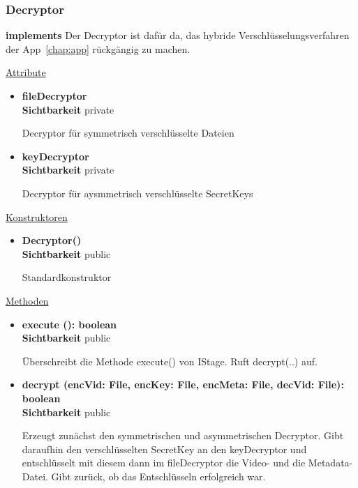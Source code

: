 \subsubsection{Decryptor} \label{service:klasse:Decryptor}
\textbf{implements}  \newline
Der Decryptor ist dafür da, das hybride Verschlüsselungsverfahren der App~\eqref{chap:app} rückgängig zu machen.\newline

\underline{Attribute}
\begin{itemize}
\itemsep0pt
\item \textbf{fileDecryptor} \hfill \\
\textbf{Sichtbarkeit} private

Decryptor für symmetrisch verschlüsselte Dateien

\item \textbf{keyDecryptor} \hfill \\
\textbf{Sichtbarkeit} private

Decryptor für aysmmetrisch verschlüsselte SecretKeys

\end{itemize}

\underline{Konstruktoren}
\begin{itemize}
\itemsep0pt
\item \textbf{Decryptor()} \hfill\\
\textbf{Sichtbarkeit} public

Standardkonstruktor
\end{itemize}

\underline{Methoden}
\begin{itemize}
\itemsep0pt
\item \textbf{execute (): boolean}\hfill\\
\textbf{Sichtbarkeit} public

Überschreibt die Methode execute() von IStage. Ruft decrypt(..) auf.

\item \textbf{decrypt (encVid: File, encKey: File, 
encMeta: File, decVid: File): boolean}\hfill\\
\textbf{Sichtbarkeit} public

Erzeugt zunächst den symmetrischen und asymmetrischen Decryptor. Gibt daraufhin den verschlüsselten SecretKey an den keyDecryptor und entschlüsselt mit diesem dann im fileDecryptor die Video- und die Metadata-Datei. Gibt zurück, ob das Entschlüsseln erfolgreich war.

\end{itemize}